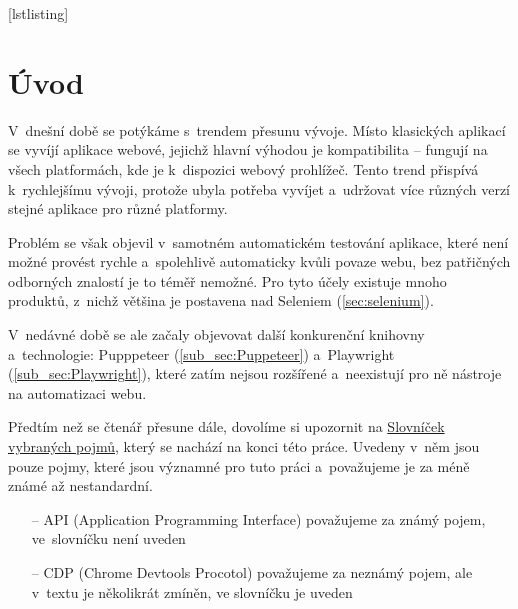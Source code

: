 \documentclass[12pt, a4paper, twoside]{article}
\def\printVersion{}
\begin{document}
	
\makeatletter


	[lstlisting]%
	\renewcommand*{\thellabel}{%
		\ifnum\value{llabel}<0 %
		\@ctrerr
		\else
		\ifnum\value{llabel}>10 %
		\@ctrerr
		\else
		\protect\ding{\the\numexpr\value{llabel}+201\relax}%
		\fi
		\fi
	}%

\newlength{\llabelsep}
\setlength{\llabelsep}{5pt}

\newcommand*{\llabel}[1]{%
	\begingroup
	\refstepcounter{llabel}%
	\label{#1}%
	\llap{%
		\thellabel\kern\llabelsep
		\hphantom{\lst@numberstyle\the\lst@lineno}%
		\kern\lst@numbersep
	}%
	\endgroup
}
\makeatother
	
	
	
	
	
	\ifdefined\printVersion
	\else
		\afterpage{\aftergroup\restoregeometry}
	\fi
		
	\tableofcontents
	\onehalfspacing
	\newpage
	\printglossary[title=Seznam nestandardních a~méně známých zkratek, toctitle=Seznam nestandardních a~méně známých zkratek, type=\acronymtype]
	\newpage
	\section{Úvod}
	V~dnešní době se potýkáme s~trendem přesunu vývoje. Místo klasických aplikací se vyvíjí aplikace webové, jejichž hlavní výhodou je kompatibilita -- fungují na všech platformách, kde je k~dispozici webový prohlížeč. Tento trend přispívá k~rychlejšímu vývoji, protože ubyla potřeba vyvíjet a~udržovat více různých verzí stejné aplikace pro různé platformy. 
	
	Problém se však objevil v~samotném automatickém testování aplikace, které není možné provést rychle a~spolehlivě automaticky kvůli povaze webu, bez patřičných odborných znalostí je to téměř nemožné. Pro tyto účely existuje mnoho produktů, z~nichž většina je postavena nad Seleniem (\ref{sec:selenium}). 
	
	V~nedávné době se ale začaly objevovat další konkurenční knihovny a~technologie: Pupppeteer (\ref{sub_sec:Puppeteer}) a~Playwright (\ref{sub_sec:Playwright}), které zatím nejsou rozšířené a~neexistují pro ně nástroje na automatizaci webu.
	
	Předtím než se čtenář přesune dále, dovolíme si upozornit na \hyperref[glossary]{Slovníček vybraných pojmů}, který se nachází na konci této práce. Uvedeny v~něm jsou pouze pojmy, které jsou významné pro tuto práci a~považujeme je za méně známé až nestandardní.
	\begin{itemize}
		\item[--] API (Application Programming Interface) považujeme za známý pojem, ve~slovníčku není uveden
		\item[--] CDP (Chrome Devtools Procotol) považujeme za neznámý pojem, ale v~textu je několikrát zmíněn, ve slovníčku je uveden
	\end{itemize}
\end{document}
